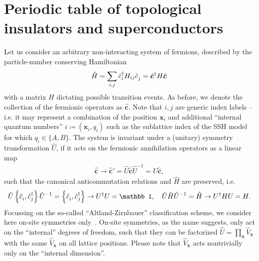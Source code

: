 \section{Periodic table of topological insulators and superconductors}
\label{sec:Periodic_table_of_topological_insulators_and_superconductors}
%
%
Let us consider an arbitrary non-interacting system of fermions, described by the particle-number conserving Hamiltonian
\begin{align}
    \hat H = \sum_{i,j}\hat c^\dag_{i}H_{ij}\hat c^\pdag_j = \hat{\bm c}^\dag H \hat{\bm c}^\pdag
\end{align}
with a matrix $H$ dictating possible transition events.
As before, we denote the collection of the fermionic operators as $\hat{\bm c}$.
Note that $i,j$ are generic index labels -- i.e. it may represent a combination of the position $\bm x_i$ and additional ``internal quantum numbers'' $i\coloneqq(\bm x_i,q_i)$ such as the sublattice index of the SSH model for which $q_i\in \{A,B\}$.
The system is invariant under a (unitary) symmetry transformation $\hat U$, if it acts on the fermionic annihilation operators as a linear map
\begin{align}
    \hat{\bm c}\rightarrow \hat{\bm c}' = \hat U \hat{\bm c} \hat U^{-1} = U \hat{\bm c},
\end{align}
such that the canonical anticommutation relations and $\hat H$ are preserved, i.e.
\begin{align}
    \hat U\anticommutator{\hat c_i^\pdag,\hat c_j^\dag}\hat U^{-1}
    =
    \anticommutator{\hat c_i^\pdag,\hat c_j^\dag}
    \rightarrow
    U^\dag U = \mathbb1
    ,\quad
    \hat U \hat H \hat U^{-1} = \hat H
    \rightarrow
    U^\dag H U = H
    .
\end{align}
Focussing on the so-called ``Altland-Zirnbauer'' classification scheme, we consider here on-site symmetries only~\cite{Altland1997}.
On-site symmetries, as the name suggests, only act on the ``internal'' degrees of freedom, such that they can be factorized $\hat U=\prod_{\bm x}\hat V_{\bm x}$ with the same $\hat V_{\bm x}$ on all lattice positions.
Please note that $\hat V_{\bm x}$ acts nontrivially only on the ``internal dimension''.

